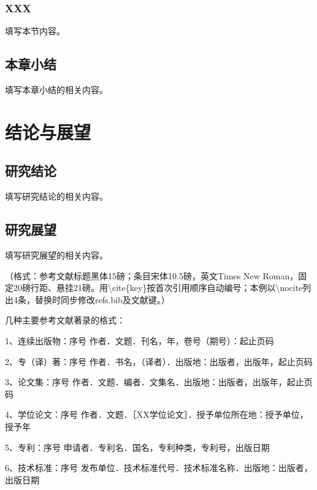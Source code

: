 \documentclass{研究生大论文模板}
\begin{document}
\subsubsection{XXX}
填写本节内容。

\subsection{本章小结}
填写本章小结的相关内容。

\section{结论与展望}
\subsection{研究结论}
填写研究结论的相关内容。

\subsection{研究展望}
填写研究展望的相关内容。

\nocite{korn,drachman,zhang,pu}



\begingroup
\normalfont\songti\fontsize{12bp}{20bp}\selectfont\parindent=24bp\relax
\par\vspace{10bp}
（格式：参考文献标题黑体15磅；条目宋体10.5磅，英文Times New Roman，固定20磅行距、悬挂21磅。用\textbackslash cite\{key\}按首次引用顺序自动编号；本例以\textbackslash nocite列出4条，替换时同步修改refs.bib及文献键。）

\par\noindent 几种主要参考文献著录的格式：
\par 1、连续出版物：序号 作者．文题．刊名，年，卷号（期号）：起止页码
\par 2、专（译）著：序号 作者．书名，（译者）．出版地：出版者，出版年，起止页码
\par 3、论文集：序号 作者．文题．编者．文集名．出版地：出版者，出版年，起止页码
\par 4、学位论文：序号 作者．文题．［XX学位论文］．授予单位所在地：授予单位，授予年
\par 5、专利：序号 申请者．专利名．国名，专利种类，专利号，出版日期
\par 6、技术标准：序号 发布单位．技术标准代号．技术标准名称．出版地：出版者，出版日期
\par\endgroup
\end{document}
